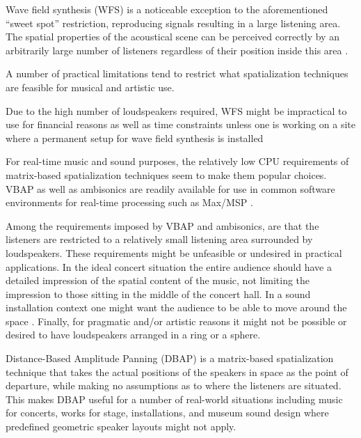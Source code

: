 \documentclass[twoside,10pt]{article}
\begin{document}
Wave field synthesis (WFS) is a noticeable exception to the aforementioned ``sweet spot'' restriction, reproducing signals resulting in a large listening area. The spatial properties of the acoustical scene can be perceived correctly by an arbitrarily large number of listeners regardless of their position inside this area \cite{Spors:2004sound_field_synthesis}.

A number of practical limitations tend to restrict what spatialization techniques are feasible for musical and artistic use.

Due to the high number of loudspeakers required, WFS might be impractical to use for financial reasons as well as time constraints unless one is working on a site where a permanent setup for wave field synthesis is installed

For real-time music and sound purposes, the relatively low CPU requirements of matrix-based spatialization techniques seem to make them popular choices. VBAP as well as ambisonics are readily available for use in common software environments for real-time processing such as Max/MSP \cite{Pulkki:2000vbap_max, Schacher:2006ambi_max, Neukom:2008ambipan}.

Among the requirements imposed by VBAP and ambisonics, are that the listeners are restricted to a relatively small listening area surrounded by loudspeakers.  These requirements might be unfeasible or undesired in practical applications.  In the ideal concert situation the entire audience should have a detailed impression of the spatial content of the music, not limiting the impression to those sitting in the middle of the concert hall. In a sound installation context one might want the audience to be able to move around the space \cite{lossius:2008installations}.  Finally, for pragmatic and/or artistic reasons it might not be possible or desired to have loudspeakers arranged in a ring or a sphere.

Distance-Based Amplitude Panning (DBAP) is a matrix-based spatialization technique that takes the actual positions of the speakers in space as the point of departure, while making no assumptions as to where the listeners are situated. This makes DBAP useful for a number of real-world situations including music for concerts, works for stage, installations, and museum sound design where predefined geometric speaker layouts might not apply.


%
%
\end{document}

